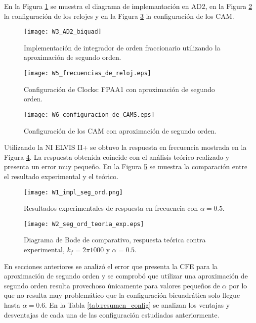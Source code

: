 	En la Figura \ref{fig:W3_AD2_biquad} se muestra el diagrama de implemantación en AD2, en la Figura \ref{fig:W5_frecuencias_de_reloj} la configuración de los relojes y en la Figura \ref{fig:W6_configuracion_de_CAMS} la configuración de los CAM.
	\begin{figure}[!ht] 
		\caption{Implementación de integrador de orden fraccionario utilizando la aproximación de segundo orden.}
		\label{fig:W3_AD2_biquad}
		\centering
		\texttt{[image: W3\_AD2\_biquad]}
	\end{figure}
	
	\begin{figure}[!ht] 
		\caption{Configuración de Clocks: FPAA1 con aproximación de segundo orden.}
		\label{fig:W5_frecuencias_de_reloj}
		\centering
		\texttt{[image: W5\_frecuencias\_de\_reloj.eps]}
	\end{figure}
	
	\begin{figure}[!ht] 
		\caption{Configuración de los CAM con aproximación de segundo orden.}
		\label{fig:W6_configuracion_de_CAMS}
		\centering
		\texttt{[image: W6\_configuracion\_de\_CAMS.eps]}
	\end{figure}
	
	Utilizando la NI ELVIS II+ se obtuvo la respuesta en frecuencia mostrada en la Figura \ref{fig:W1_impl_seg_ord}. La respuesta obtenida coincide con el análisis teórico realizado y presenta un error muy pequeño. En la Figura \ref{fig:W2_seg_ord_teoria_exp} se muestra la comparación entre el resultado experimental y el teórico.
	\begin{figure}[!ht] 
		\caption{Resultados experimentales de respuesta en frecuencia con $\alpha = 0.5$.}
		\label{fig:W1_impl_seg_ord}
		\centering
		\texttt{[image: W1\_impl\_seg\_ord.png]}
	\end{figure}
	
	\begin{figure}[!ht]
		\caption{Diagrama de Bode de comparativo, respuesta teórica contra experimental,  $k_{f} = 2\pi 1000$ y  $\alpha = 0.5$.} 
		\label{fig:W2_seg_ord_teoria_exp}
		\centering
		\texttt{[image: W2\_seg\_ord\_teoria\_exp.eps]}
	\end{figure}
	
	En secciones anteriores se analizó el error que presenta la CFE para la aproximación de segundo orden y se comprobó que utilizar una aproximación de segundo orden resulta provechoso únicamente para valores pequeños de $\alpha$ por lo que no resulta muy problemático que la configuración bicuadrática solo llegue hasta $\alpha = 0.6$. En la Tabla \ref{tab:resumen_config} se analizan los ventajas y desventajas de cada una de las configuración estudiadas anteriormente.
	
